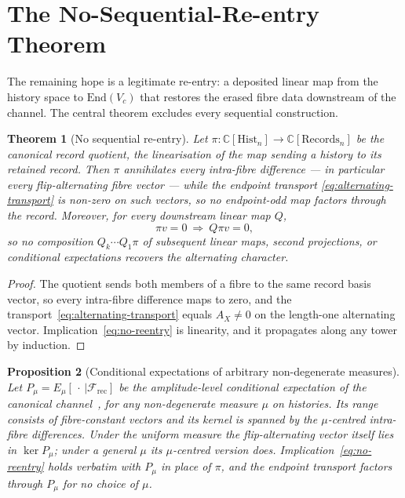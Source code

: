 \documentclass[11pt,a4paper]{article}
\newtheorem{theorem}{Theorem}[section]
\newtheorem{proposition}[theorem]{Proposition}
\theoremstyle{definition}
\theoremstyle{remark}
\newcommand{\C}{\mathbb{C}}
\newcommand{\End}{\mathrm{End}}
\newcommand{\Vc}{V_{c}}
\newcommand{\AX}{A_{X}}
\begin{document}
\section{The No-Sequential-Re-entry Theorem}
\label{sec:no-reentry}

The remaining hope is a legitimate re-entry: a deposited linear map from the history
space to $\End(\Vc)$ that restores the erased fibre data downstream of the channel.
The central theorem excludes every sequential construction.

\begin{theorem}[No sequential re-entry]
  \label{thm:no-reentry}
  Let $\pi\colon\C[\mathrm{Hist}_n]\to\C[\mathrm{Records}_n]$ be the canonical record
  quotient, the linearisation of the map sending a history to its retained record.
  Then $\pi$ annihilates every intra-fibre difference --- in particular every
  flip-alternating fibre vector --- while the endpoint transport
  \eqref{eq:alternating-transport} is non-zero on such vectors, so no endpoint-odd map
  factors through the record.
  Moreover, for every downstream linear map $Q$,
  \begin{equation}
    \pi v=0\ \Longrightarrow\ Q\pi v=0,
    \label{eq:no-reentry}
  \end{equation}
  so no composition $Q_k\cdots Q_1\pi$ of subsequent linear maps, second projections,
  or conditional expectations recovers the alternating character.
\end{theorem}

\begin{proof}
  The quotient sends both members of a fibre to the same record basis vector, so every
  intra-fibre difference maps to zero, and the
  transport~\eqref{eq:alternating-transport} equals $\AX\neq0$ on the length-one
  alternating vector.
  Implication~\eqref{eq:no-reentry} is linearity, and it propagates along any tower by
  induction.
\end{proof}

\begin{proposition}[Conditional expectations of arbitrary non-degenerate measures]
  \label{prop:conditional-expectation}
  Let $P_\mu=E_\mu[\,\cdot\,|\mathcal{F}_{\mathrm{rec}}]$ be the amplitude-level
  conditional expectation of the canonical channel~\cite{Beau2026pce}, for any
  non-degenerate measure $\mu$ on histories.
  Its range consists of fibre-constant vectors and its kernel is spanned by the
  $\mu$-centred intra-fibre differences.
  Under the uniform measure the flip-alternating vector itself lies in $\ker P_\mu$;
  under a general $\mu$ its $\mu$-centred version does.
  Implication~\eqref{eq:no-reentry} holds verbatim with $P_\mu$ in place of $\pi$, and
  the endpoint transport factors through $P_\mu$ for no choice of $\mu$.
\end{proposition}
\end{document}
